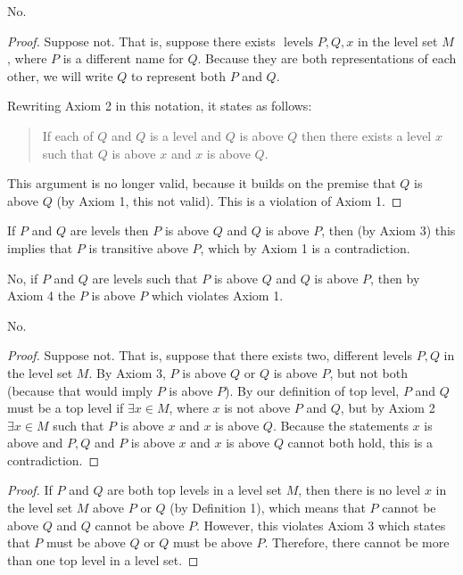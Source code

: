 \problem
No.

\begin{proof}
    Suppose not. That is, suppose there exists $\text{ levels } P, Q, x$ in the level set $M$, where $P$ is a different name for $Q$. Because they are both representations of each other, we will write $Q$ to represent both $P$ and $Q$.

    Rewriting Axiom 2 in this notation, it states as follows:

    \begin{quote}
        If each of $Q$ and $Q$ is a level and $Q$ is above $Q$ then there exists a level $x$ such that $Q$ is above $x$ and $x$ is above $Q$.
    \end{quote}

    This argument is no longer valid, because it builds on the premise that $Q$ is above $Q$ (by Axiom 1, this not valid). This is a violation of Axiom 1.
\end{proof}

\problem
If $P$ and $Q$ are levels then $P$ is above $Q$ and $Q$ is above $P$, then (by Axiom 3) this implies that $P$ is transitive above $P$, which by Axiom 1 is a contradiction.

No, if $P$ and $Q$ are levels such that $P$ is above $Q$ and $Q$ is above $P$, then by Axiom 4 the $P$ is above $P$ which violates Axiom 1.


\problem
No.

\begin{proof}
    Suppose not. That is, suppose that there exists two, different levels $P, Q$ in the level set $M$. By Axiom 3, $P$ is above $Q$ or $Q$ is above $P$, but not both (because that would imply $P$ is above $P$). By our definition of top level, $P$ and $Q$ must be a top level if $\exists x \in M$, where $x$ is not above $P$ and $Q$, but by Axiom 2 $\exists x \in M$ such that $P$ is above $x$ and $x$ is above $Q$. Because the statements $x$ is above and $P, Q$ and $P$ is above $x$ and $x$ is above $Q$ cannot both hold, this is a contradiction.
\end{proof}

\begin{proof}
    If $P$ and $Q$ are both top levels in a level set $M$, then there is no level $x$ in the level set $M$ above $P$ or $Q$ (by Definition 1), which means that $P$ cannot be above $Q$ and $Q$ cannot be above $P$. However, this violates Axiom 3 which states that $P$ must be above $Q$ or $Q$ must be above $P$. Therefore, there cannot be more than one top level in a level set.
\end{proof}


